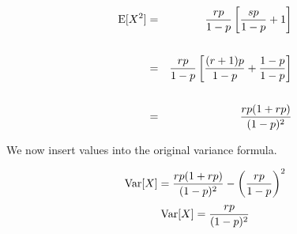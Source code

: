 \documentclass[a4paper,12pt]{article}
\begin{document}
\begin{eqnarray*}
\operatorname{E}[X^2] &=& {rp \over 1-p}\left[{sp \over 1-p}+1\right]\\
& & \\
&=& {rp \over 1-p}\left[{(r+1)p \over 1-p}+ {1-p \over 1-p} \right]\\
& & \\
&=&  {rp(1+rp) \over (1-p)^2}\\
\end{eqnarray*}

We now insert values into the original variance formula.

\[\operatorname{Var}[X] = {rp(1+rp) \over (1-p)^2} - \left({rp \over 1-p}\right)^2\]
\[\operatorname{Var}[X] = {rp \over (1-p)^2} \]
\end{document}
